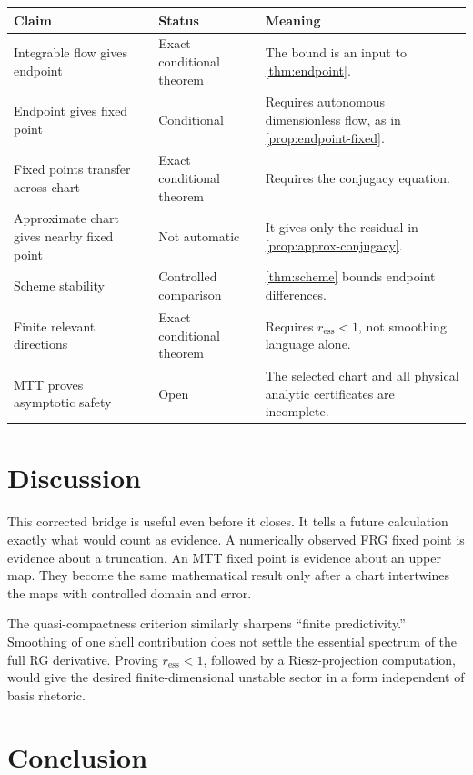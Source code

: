 \documentclass[11pt]{article}
\theoremstyle{definition}
\theoremstyle{remark}
\begin{document}
\begin{center}
\begin{tabularx}{\textwidth}{@{}
>{\raggedright\arraybackslash}p{}
>{\raggedright\arraybackslash}p{}
>{\raggedright\arraybackslash}X@{}}
\toprule
Claim & Status & Meaning\\
\midrule
Integrable flow gives endpoint & Exact conditional theorem &
The bound is an input to \autoref{thm:endpoint}.\\
Endpoint gives fixed point & Conditional &
Requires autonomous dimensionless flow, as in
\autoref{prop:endpoint-fixed}.\\
Fixed points transfer across chart & Exact conditional theorem &
Requires the conjugacy equation.\\
Approximate chart gives nearby fixed point & Not automatic &
It gives only the residual in \autoref{prop:approx-conjugacy}.\\
Scheme stability & Controlled comparison &
\autoref{thm:scheme} bounds endpoint differences.\\
Finite relevant directions & Exact conditional theorem &
Requires \(r_{\mathrm{ess}}<1\), not smoothing language alone.\\
MTT proves asymptotic safety & Open &
The selected chart and all physical analytic certificates are incomplete.\\
\bottomrule
\end{tabularx}
\end{center}

\section{Discussion}

This corrected bridge is useful even before it closes. It tells a future
calculation exactly what would count as evidence. A numerically observed FRG
fixed point is evidence about a truncation. An MTT fixed point is evidence
about an upper map. They become the same mathematical result only after a
chart intertwines the maps with controlled domain and error.

The quasi-compactness criterion similarly sharpens ``finite
predictivity.'' Smoothing of one shell contribution does not settle the
essential spectrum of the full RG derivative. Proving
\(r_{\mathrm{ess}}<1\), followed by a Riesz-projection computation, would
give the desired finite-dimensional unstable sector in a form independent
of basis rhetoric.

\section{Conclusion}
\end{document}
